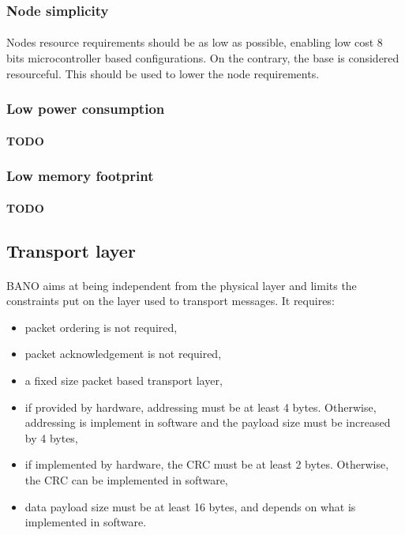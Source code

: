 \documentclass[a4paper, 11pt]{article}
\begin{document}
\subsubsection{Node simplicity}
\paragraph{}
Nodes resource requirements should be as low as possible, enabling low cost
8 bits microcontroller based configurations. On the contrary, the base is
considered resourceful. This should be used to lower the node requirements.

\subsubsection{Low power consumption}
\paragraph{}
\textbf{TODO}

\subsubsection{Low memory footprint}
\paragraph{}
\textbf{TODO}


\subsection{Transport layer}
\paragraph{}
BANO aims at being independent from the physical layer and limits the
constraints put on the layer used to transport messages. It requires:
\begin{itemize}
\item packet ordering is not required,
\item packet acknowledgement is not required,
\item a fixed size packet based transport layer,
\item if provided by hardware, addressing must be at least 4 bytes.
Otherwise, addressing is implement in software and the payload size must be
increased by 4 bytes,
\item if implemented by hardware, the CRC must be at least 2 bytes. Otherwise,
the CRC can be implemented in software,
\item data payload size must be at least 16 bytes, and depends on what is
implemented in software.
\end{itemize}
\end{document}
